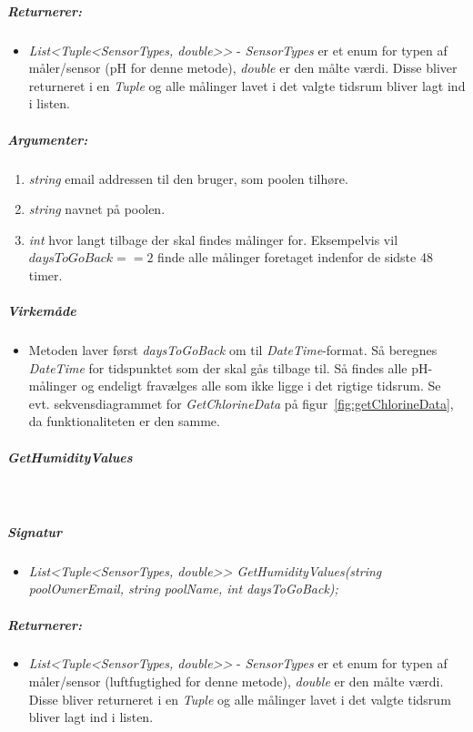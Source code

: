 \subparagraph{Returnerer:}
\begin{itemize}
	\item \textit{List<Tuple<SensorTypes, double>>} - \textit{SensorTypes} er et enum for typen af måler/sensor (pH for denne metode), \textit{double} er den målte værdi. Disse bliver returneret i en \textit{Tuple} og alle målinger lavet i det valgte tidsrum bliver lagt ind i listen.
\end{itemize}

\subparagraph{Argumenter:}
\begin{enumerate}
	\item \textit{string} email addressen til den bruger, som poolen tilhøre.
	\item \textit{string} navnet på poolen.
	\item \textit{int} hvor langt tilbage der skal findes målinger for. Eksempelvis vil $daysToGoBack == 2$ finde alle målinger foretaget indenfor de sidste 48 timer.
\end{enumerate}

\subparagraph{Virkemåde}
\begin{itemize}
	\item Metoden laver først \textit{daysToGoBack} om til \textit{DateTime}-format. Så beregnes \textit{DateTime} for tidspunktet som der skal gås tilbage til. Så findes alle pH-målinger og endeligt fravælges alle som ikke ligge i det rigtige tidsrum. Se evt. sekvensdiagrammet for \textit{GetChlorineData} på figur~\ref{fig:getChlorineData}, da funktionaliteten er den samme.
\end{itemize}

\subparagraph{GetHumidityValues}\ %

\subparagraph{Signatur}
\begin{itemize}
	\item \textit{List<Tuple<SensorTypes, double>> GetHumidityValues(string poolOwnerEmail, string poolName, int daysToGoBack);}
\end{itemize}

\subparagraph{Returnerer:}
\begin{itemize}
	\item \textit{List<Tuple<SensorTypes, double>>} - \textit{SensorTypes} er et enum for typen af måler/sensor (luftfugtighed for denne metode), \textit{double} er den målte værdi. Disse bliver returneret i en \textit{Tuple} og alle målinger lavet i det valgte tidsrum bliver lagt ind i listen.
\end{itemize}


